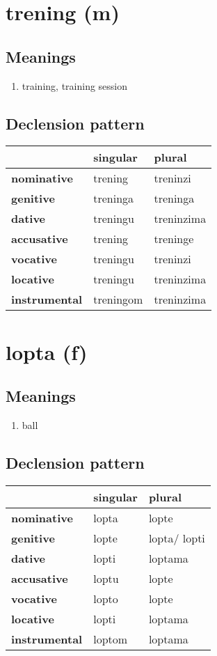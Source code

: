 \filbreak
\section{trening (m)}
\subsection*{Meanings}
\begin{enumerate}
\item training, training session
\end{enumerate}
\subsection*{Declension pattern}
\begin{tabularx}{\linewidth}{Xll}
\toprule
{} &   singular &      plural \\
\midrule
\textbf{nominative  } &    trening &    treninzi \\
\textbf{genitive    } &   treninga &    treninga \\
\textbf{dative      } &   treningu &  treninzima \\
\textbf{accusative  } &    trening &    treninge \\
\textbf{vocative    } &   treningu &    treninzi \\
\textbf{locative    } &   treningu &  treninzima \\
\textbf{instrumental} &  treningom &  treninzima \\
\bottomrule
\end{tabularx}

\filbreak
\section{lopta (f)}
\subsection*{Meanings}
\begin{enumerate}
\item ball
\end{enumerate}
\subsection*{Declension pattern}
\begin{tabularx}{\linewidth}{Xll}
\toprule
{} & singular &        plural \\
\midrule
\textbf{nominative  } &    lopta &         lopte \\
\textbf{genitive    } &    lopte &  lopta/ lopti \\
\textbf{dative      } &    lopti &       loptama \\
\textbf{accusative  } &    loptu &         lopte \\
\textbf{vocative    } &    lopto &         lopte \\
\textbf{locative    } &    lopti &       loptama \\
\textbf{instrumental} &   loptom &       loptama \\
\bottomrule
\end{tabularx}

